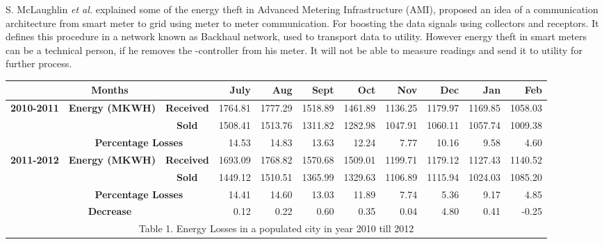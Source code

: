 \documentclass[10pt, conference, compsocconf]{IEEEtran}
\begin{document}
S. McLaughlin \textit{et al.} explained some of the energy theft in Advanced Metering Infrastructure (AMI), proposed an idea of a communication architecture from smart meter to grid using meter to meter communication. For boosting the data signals using collectors and receptors. It defines this procedure in a network known as Backhaul network, used to transport data to utility. However energy theft in smart meters can be a technical person, if he removes the -controller from his meter. It will not be able to measure readings and send it to utility for further process.

\begin{table*}[t]
\begin{center}
\begin{tabular}{|m{2cm}|c|c|r|r|r|r|r|r|r|r|}
\hline
\multicolumn{ 3}{|c|}{{\bf Months }} & {\bf July} & {\bf Aug} & {\bf Sept} & {\bf Oct} & {\bf Nov} & {\bf Dec} & {\bf Jan} & {\bf Feb} \\
\hline
\multicolumn{ 1}{|c|}{{\bf 2010-2011}} & \multicolumn{ 1}{|c|}{{\bf Energy (MKWH)}} & {\bf Received} &  1764.81 &  1777.29 &  1518.89 &  1461.89 &  1136.25 &  1179.97 &  1169.85 &  1058.03 \\ \cline{3-11}

\multicolumn{ 1}{|c|}{{\bf }} & \multicolumn{ 1}{|c|}{{\bf }} & {\bf Sold} &  1508.41 &  1513.76 &  1311.82 &  1282.98 &  1047.91 &  1060.11 &  1057.74 &  1009.38 \\
\cline{2-11}
\multicolumn{ 1}{|c|}{{\bf }} & \multicolumn{ 2}{|c|}{{\bf Percentage Losses}} &    14.53 &    14.83 &    13.63 &    12.24 &     7.77 &    10.16 &     9.58 &     4.60 \\
\hline
\multicolumn{ 1}{|c|}{{\bf 2011-2012}} & \multicolumn{ 1}{|c|}{{\bf Energy (MKWH)}} & {\bf Received} &  1693.09 &  1768.82 &  1570.68 &  1509.01 &  1199.71 &  1179.12 &  1127.43 &  1140.52 \\ \cline{3-11}

\multicolumn{ 1}{|c|}{{\bf }} & \multicolumn{ 1}{|c|}{{\bf }} & {\bf Sold} &  1449.12 &  1510.51 &  1365.99 &  1329.63 &  1106.89 &  1115.94 &  1024.03 &  1085.20 \\
\cline{2-11}
\multicolumn{ 1}{|c|}{{\bf }} & \multicolumn{ 2}{|c|}{{\bf Percentage Losses}} &    14.41 &    14.60 &    13.03 &    11.89 &     7.74 &     5.36 &     9.17 &     4.85 \\
\hline
\multicolumn{ 3}{|c|}{{\bf Decrease}} &     0.12 &     0.22 &     0.60 &     0.35 &     0.04 &     4.80 &     0.41 &    -0.25 \\
\hline
                                  \multicolumn{ 11}{c}{Table 1. Energy Losses in a populated city in year 2010 till 2012} \\
\end{tabular}
\end{center}
\end{table*}
\end{document}
